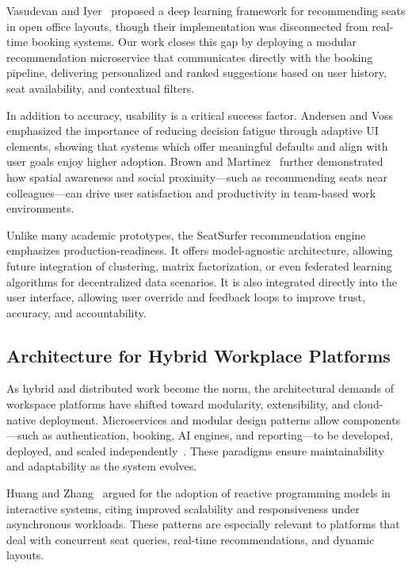 \documentclass[onecolumn, 12pt]{IEEEtran}
\begin{document}
Vasudevan and Iyer~\cite{vasudevan2023smart} proposed a deep learning framework for recommending seats in open office layouts, though their implementation was disconnected from real-time booking systems. Our work closes this gap by deploying a modular recommendation microservice that communicates directly with the booking pipeline, delivering personalized and ranked suggestions based on user history, seat availability, and contextual filters.

In addition to accuracy, usability is a critical success factor. Andersen and Voss~\cite{andersen2023ux} emphasized the importance of reducing decision fatigue through adaptive UI elements, showing that systems which offer meaningful defaults and align with user goals enjoy higher adoption. Brown and Martinez~\cite{brown2022usertracking} further demonstrated how spatial awareness and social proximity—such as recommending seats near colleagues—can drive user satisfaction and productivity in team-based work environments.

Unlike many academic prototypes, the SeatSurfer recommendation engine emphasizes production-readiness. It offers model-agnostic architecture, allowing future integration of clustering, matrix factorization, or even federated learning algorithms for decentralized data scenarios. It is also integrated directly into the user interface, allowing user override and feedback loops to improve trust, accuracy, and accountability.

\subsection{Architecture for Hybrid Workplace Platforms}

As hybrid and distributed work become the norm, the architectural demands of workspace platforms have shifted toward modularity, extensibility, and cloud-native deployment. Microservices and modular design patterns allow components—such as authentication, booking, AI engines, and reporting—to be developed, deployed, and scaled independently~\cite{torres2023micro}. These paradigms ensure maintainability and adaptability as the system evolves.

Huang and Zhang~\cite{huang2023reactive} argued for the adoption of reactive programming models in interactive systems, citing improved scalability and responsiveness under asynchronous workloads. These patterns are especially relevant to platforms that deal with concurrent seat queries, real-time recommendations, and dynamic layouts.
\end{document}
